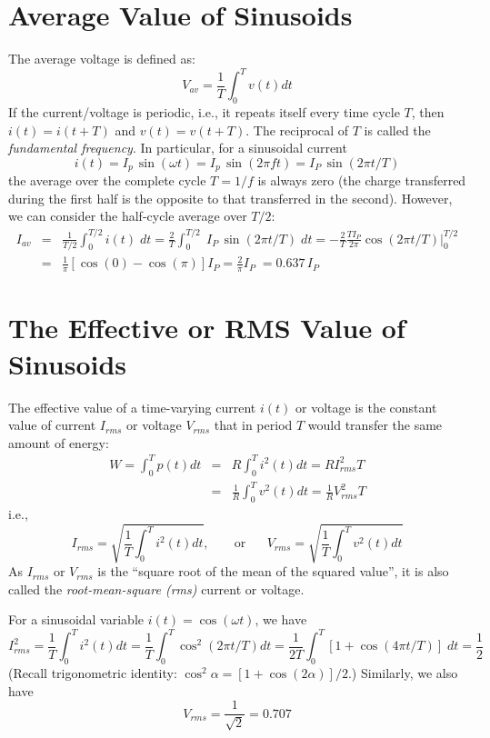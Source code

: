 \usepackage{html}


\section{Average Value of Sinusoids}

The average voltage is defined as:
\[
V_{av}=\frac{1}{T}\int_0^T v(t) dt	
\]
If the current/voltage is periodic, i.e., it repeats itself every 
time cycle $T$, then $i(t)=i(t+T)$ and $v(t)=v(t+T)$. The reciprocal 
of $T$ is called the {\em fundamental frequency}. In particular, for 
a sinusoidal current 
\[
i(t)=I_p\,\sin(\omega t)=I_p\,\sin(2\pi ft)=I_P\,\sin(2\pi t/T)
\]
the average over the complete cycle $T=1/f$ is always zero (the charge
transferred during the first half is the opposite to that transferred
in the second). However, we can consider the half-cycle average over 
$T/2$:
\begin{eqnarray} 
  I_{av}&=&\frac{1}{T/2}\int_0^{T/2} i(t)\; dt
  =\frac{2}{T}\int_0^{T/2} \;I_P\,\sin(2\pi t/T)\;dt	
  =-\frac{2}{T}\frac{TI_P}{2\pi} \cos(2\pi t/T)\bigg|_0^{T/2}
  \nonumber \\
  &=& \frac{1}{\pi}\left[\cos(0)-\cos(\pi)\right]I_P
  =\frac{2}{\pi}I_P\;=0.637\,I_P
  \nonumber
\end{eqnarray}


\section{The Effective or RMS Value of Sinusoids}

The effective value of a time-varying current $i(t)$ or voltage is the 
constant value of current $I_{rms}$ or voltage $V_{rms}$ that in period 
$T$ would transfer the same amount of energy:
\begin{eqnarray}
  W=\int_0^T p(t) dt&=&R\int_0^T i^2(t) dt
  =R I^2_{rms}T
  \nonumber \\
  &=&\frac{1}{R}\int_0^T v^2(t) dt=\frac{1}{R}V^2_{rms}T
  \nonumber
\end{eqnarray}
i.e.,
\[ 
I_{rms}=\sqrt{\frac{1}{T}\int_0^T i^2(t) dt},\;\;\;\;\;\;\;\mbox{or}\;\;\;\;\;\;
V_{rms}=\sqrt{\frac{1}{T}\int_0^T v^2(t) dt}	
\]
As $I_{rms}$ or $V_{rms}$ is the ``square root of the mean of the squared value'',
it is also called the {\em root-mean-square (rms)} current or voltage.

For a sinusoidal variable $i(t)=\cos(\omega t)$, we have
\[ 
I^2_{rms} = \frac{1}{T}\int_0^T i^2(t) dt
= \frac{1}{T}\int_0^T \cos^2(2\pi t/T) dt
= \frac{1}{2T}\int_0^T [1+\cos(4\pi t/T)]\; dt=\frac{1}{2} 
\]
(Recall trigonometric identity: $\cos^2\alpha=[1+\cos(2\alpha)]/2$.)
Similarly, we also have 
\[
V_{rms}=\frac{1}{\sqrt{2}}=0.707
\]


